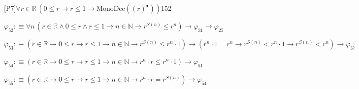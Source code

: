 \begin{fullproof}{[P7]}{$\forall r \in \mathbb{R}\,(0 \leq r \to r \leq 1 \to \mathrm{MonoDec}({(r)^{\bullet}}))$}{152}
\begin{abbrevlist}
\item $\varphi_{52} :\equiv \forall n\,(r \in \mathbb{R} \land 0 \leq r \land r \leq 1 \to n \in \mathbb{N} \to {{r}^{S(n)}} \leq {{r}^{n}}) \to \varphi_{31} \to \varphi_{25}$
\item $\varphi_{53} :\equiv (r \in \mathbb{R} \to 0 \leq r \to r \leq 1 \to n \in \mathbb{N} \to {{r}^{S(n)}} \leq {{r}^{n}} \cdot 1) \to ({{r}^{n}} \cdot 1 = {{r}^{n}} \to {{r}^{S(n)}} < {{r}^{n}} \cdot 1 \to {{r}^{S(n)}} < {{r}^{n}}) \to \varphi_{37}$
\item $\varphi_{54} :\equiv (r \in \mathbb{R} \to 0 \leq r \to r \leq 1 \to n \in \mathbb{N} \to {{r}^{n}} \cdot r \leq {{r}^{n}} \cdot 1) \to \varphi_{51}$
\item $\varphi_{55} :\equiv (r \in \mathbb{R} \to 0 \leq r \to r \leq 1 \to n \in \mathbb{N} \to {{r}^{n}} \cdot r = {{r}^{S(n)}}) \to \varphi_{54}$
\end{abbrevlist}
\end{fullproof}
